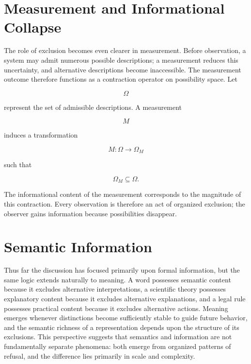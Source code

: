 \documentclass[11pt,oneside]{book}
\theoremstyle{plain}
\theoremstyle{definition}
\theoremstyle{remark}
\begin{document}
\section{Measurement and Informational Collapse}

The role of exclusion becomes even clearer in measurement. Before observation, a system may admit numerous possible descriptions; a measurement reduces this uncertainty, and alternative descriptions become inaccessible. The measurement outcome therefore functions as a contraction operator on possibility space. Let

\begin{equation}
\Omega
\end{equation}

represent the set of admissible descriptions. A measurement

\begin{equation}
M
\end{equation}

induces a transformation

\begin{equation}
M :
\Omega
\rightarrow
\Omega_M
\end{equation}

such that

\begin{equation}
\Omega_M
\subseteq
\Omega.
\end{equation}

The informational content of the measurement corresponds to the magnitude of this contraction. Every observation is therefore an act of organized exclusion; the observer gains information because possibilities disappear.

\section{Semantic Information}

Thus far the discussion has focused primarily upon formal information, but the same logic extends naturally to meaning. A word possesses semantic content because it excludes alternative interpretations, a scientific theory possesses explanatory content because it excludes alternative explanations, and a legal rule possesses practical content because it excludes alternative actions. Meaning emerges whenever distinctions become sufficiently stable to guide future behavior, and the semantic richness of a representation depends upon the structure of its exclusions. This perspective suggests that semantics and information are not fundamentally separate phenomena: both emerge from organized patterns of refusal, and the difference lies primarily in scale and complexity.
\end{document}
